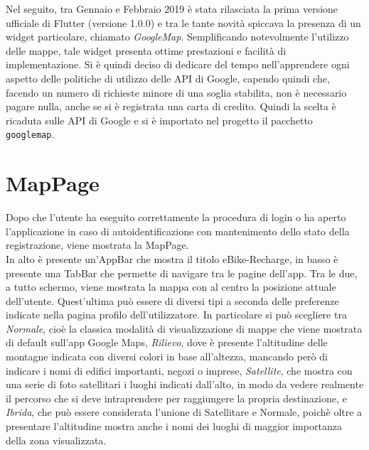 Nel seguito, tra Gennaio e Febbraio 2019 è stata rilasciata la prima versione
ufficiale di Flutter (versione 1.0.0) e tra le tante novità spiccava la presenza
di un widget particolare, chiamato \textit{GoogleMap}. Semplificando notevolmente
l'utilizzo delle mappe, tale widget presenta ottime prestazioni e facilità di
implementazione. Si è quindi deciso di dedicare del tempo nell'apprendere ogni
aspetto delle politiche di utilizzo delle API di Google, capendo quindi che,
facendo un numero di richieste minore di una soglia stabilita, non è necessario
pagare nulla, anche se si è registrata una carta di credito. Quindi la scelta è
ricaduta sulle API di Google e si è importato nel progetto il pacchetto
\verb|googlemap|.

\section{MapPage}
Dopo che l'utente ha eseguito correttamente la procedura di login o ha aperto
l'applicazione in caso di autoidentificazione con mantenimento dello stato della
registrazione, viene mostrata la MapPage. \\
In alto è presente un'AppBar che 
mostra il titolo eBike-Recharge, in basso è presente una TabBar che permette di
navigare tra le pagine dell'app. Tra le due, a tutto schermo, viene mostrata la
mappa con al centro la posizione attuale dell'utente. Quest'ultima può essere di
diversi tipi a seconda delle preferenze indicate nella pagina profilo
dell'utilizzatore. In particolare si può scegliere tra \textit{Normale}, cioè la
classica modalità di visualizzazione di mappe che viene mostrata di default
sull'app Google Maps, \textit{Rilievo}, dove è presente l'altitudine delle
montagne indicata con diversi colori in base all'altezza, mancando però
di indicare i nomi di edifici importanti, negozi o imprese, \textit{Satellite},
che mostra con una serie di foto satellitari i luoghi indicati dall'alto, in
modo da vedere realmente il percorso che si deve intraprendere
per raggiungere la propria destinazione, e \textit{Ibrida}, che può essere
considerata l'unione di Satellitare e Normale, poichè oltre a presentare
l'altitudine mostra anche i nomi dei luoghi di maggior importanza della zona
visualizzata.


